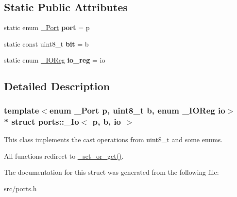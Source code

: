 \subsection*{Static Public Attributes}
\begin{DoxyCompactItemize}
\item 
static enum \hyperlink{namespaceports_a9949317f344930bd6ad1097e80c97b67}{\+\_\+\+Port} {\bfseries port} = p\hypertarget{structports_1_1__Io_adad70155dd6893a33058c00b39a61868}{}\label{structports_1_1__Io_adad70155dd6893a33058c00b39a61868}

\item 
static const uint8\+\_\+t {\bfseries bit} = b\hypertarget{structports_1_1__Io_ab6ad4e5dabbb7a274ef5299a9bdb094f}{}\label{structports_1_1__Io_ab6ad4e5dabbb7a274ef5299a9bdb094f}

\item 
static enum \hyperlink{namespaceports_a739630fb6b9a9b963453db8e865b6b14}{\+\_\+\+I\+O\+Reg} {\bfseries io\+\_\+reg} = io\hypertarget{structports_1_1__Io_aef8bb0a06b5abeef91f6916b828739df}{}\label{structports_1_1__Io_aef8bb0a06b5abeef91f6916b828739df}

\end{DoxyCompactItemize}


\subsection{Detailed Description}
\subsubsection*{template$<$enum \+\_\+\+Port p, uint8\+\_\+t b, enum \+\_\+\+I\+O\+Reg io$>$\\*
struct ports\+::\+\_\+\+Io$<$ p, b, io $>$}

This class implements the cast operations from uint8\+\_\+t and some enums. 

All functions redirect to \hyperlink{namespaceports_aa339a9d178cb414c4cf243450d5887d2}{\+\_\+set\+\_\+or\+\_\+get()}. 

The documentation for this struct was generated from the following file\+:\begin{DoxyCompactItemize}
\item 
src/ports.\+h\end{DoxyCompactItemize}
